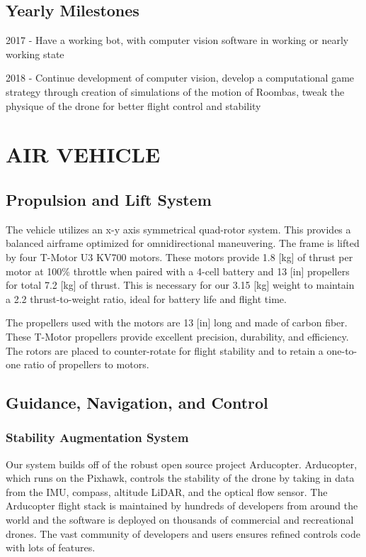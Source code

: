 \documentclass[12pt,letterpaper]{article}
\begin{document}
	\pagebreak
	\subsection*{Yearly Milestones}

	2017 - Have a working bot, with computer vision software in working or nearly working state

	2018 - Continue development of computer vision, develop a computational game strategy through creation of simulations of the motion of Roombas, tweak the physique of the drone for better flight control and stability


\section*{AIR VEHICLE}
	\subsection*{Propulsion and Lift System}
			The vehicle utilizes an x-y axis symmetrical quad-rotor system. This provides a balanced airframe optimized for omnidirectional maneuvering. The frame is lifted by four T-Motor U3 KV700 motors. These motors provide 1.8 [kg] of thrust per motor at 100\% throttle when paired with a 4-cell battery and 13 [in] propellers for total 7.2 [kg] of thrust. This is necessary for our 3.15 [kg] weight to maintain a 2.2 thrust-to-weight ratio, ideal for battery life and flight time.

			The propellers used with the motors are 13 [in] long and made of carbon fiber. These T-Motor propellers provide excellent precision, durability, and efficiency. The rotors are placed to counter-rotate for flight stability and to retain a one-to-one ratio of propellers to motors.

	\subsection*{Guidance, Navigation, and Control}
		\subsubsection*{Stability Augmentation System}
			Our system builds off of the robust open source project Arducopter. Arducopter, which runs on the Pixhawk, controls the stability of the drone by taking in data from the IMU, compass, altitude LiDAR, and the optical flow sensor. The Arducopter flight stack is maintained by hundreds of developers from around the world and the software is deployed on thousands of commercial and recreational drones. The vast community of developers and users ensures refined controls code with lots of features.
\end{document}
